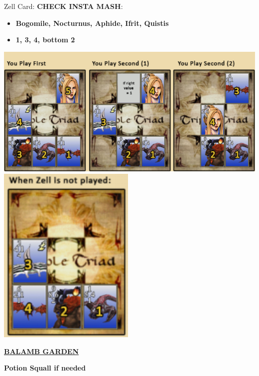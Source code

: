 Zell Card: \textbf{CHECK INSTA MASH}:
\begin{itemize}
	\item \textbf{Bogomile, Nocturnus, Aphide, Ifrit, Quistis}
	\item \textbf{1, 3, 4, bottom 2}
\end{itemize}

\includegraphics[scale=0.45]{Images/zc_win.png}
\includegraphics[scale=0.5]{Images/zc_notplayed.png}

\underline{\textbf{BALAMB GARDEN}}

\textbf{Potion Squall if needed}

